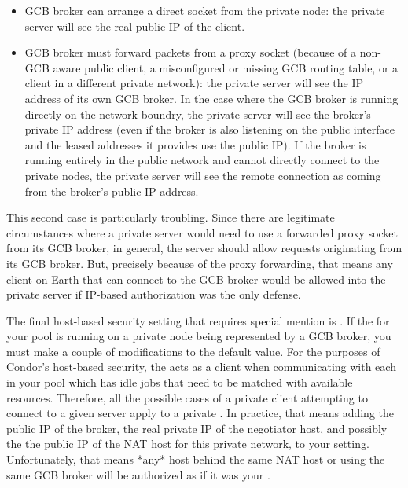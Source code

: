 \begin{itemize}

  \item GCB broker can arrange a direct socket from the private node:
  the private server will see the real public IP of the client.

  \item GCB broker must forward packets from a proxy socket (because
  of a non-GCB aware public client, a misconfigured or missing GCB
  routing table, or a client in a different private network): the
  private server will see the IP address of its own GCB broker.
  In the case where the GCB broker is running directly on the network
  boundry, the private server will see the broker's private IP
  address (even if the broker is also listening on the public
  interface and the leased addresses it provides use the public IP). 
  If the broker is running entirely in the public network and cannot
  directly connect to the private nodes, the private server will see
  the remote connection as coming from the broker's public IP
  address.

\end{itemize}

This second case is particularly troubling.
Since there are legitimate circumstances where a private server would
need to use a forwarded proxy socket from its GCB broker, in general,
the server should allow requests originating from its GCB broker.
But, precisely because of the proxy forwarding, that means any client
on Earth that can connect to the GCB broker would be allowed into the
private server if IP-based authorization was the only defense.

The final host-based security setting that requires special mention is
.
If the  for your pool is running on a private node
being represented by a GCB broker, you must make a couple of
modifications to the default value.
For the purposes of Condor's host-based security, the
 acts as a client when communicating with each 
 in your pool which has idle jobs that need to be
matched with available resources.
Therefore, all the possible cases of a private client attempting to
connect to a given server apply to a private .
In practice, that means adding the public IP of the broker, the real
private IP of the negotiator host, and possibly the the public IP of
the NAT host for this private network, to your
 setting.
Unfortunately, that means *any* host behind the same NAT host or using
the same GCB broker will be authorized as if it was your
. 

